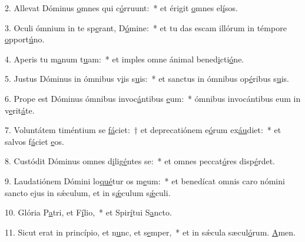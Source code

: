 2. Allevat Dóminus \uline{o}mnes qui c\uline{ó}rruunt:~* et érigit \uline{o}mnes el\uline{í}sos.\par 
3. Oculi ómnium in te sp\uline{e}rant, D\uline{ó}mine:~* et tu das escam illórum in témpore \uline{o}pport\uline{ú}no.\par 
4. Aperis tu m\uline{a}num t\uline{u}am:~* et imples omne ánimal bened\uline{i}cti\uline{ó}ne.\par 
5. Justus Dóminus in ómnibus v\uline{i}is s\uline{u}is:~* et sanctus in ómnibus op\uline{é}ribus s\uline{u}is.\par 
6. Prope est Dóminus ómnibus invoc\uline{á}ntibus \uline{e}um:~* ómnibus invocántibus eum in v\uline{e}rit\uline{á}te.\par 
7. Voluntátem timéntium se \uline{fá}ciet:~† et deprecatiónem e\uline{ó}rum ex\uline{áu}diet:~* et salvos f\uline{á}ciet \uline{e}os.\par 
8. Custódit Dóminus omnes d\uline{i}lig\uline{é}ntes se:~* et omnes peccat\uline{ó}res disp\uline{é}rdet.\par 
9. Laudatiónem Dómini lo\uline{qué}tur os m\uline{e}um:~* et benedícat omnis caro nómini sancto ejus in sǽculum, et in s\uline{ǽ}culum s\uline{ǽ}culi.\par 
10. Glória P\uline{a}tri, et F\uline{í}lio,~* et Spir\uline{í}tui S\uline{a}ncto.\par 
11. Sicut erat in princípio, et n\uline{u}nc, et s\uline{e}mper,~* et in sǽcula sæcul\uline{ó}rum. \uline{A}men.\par 
